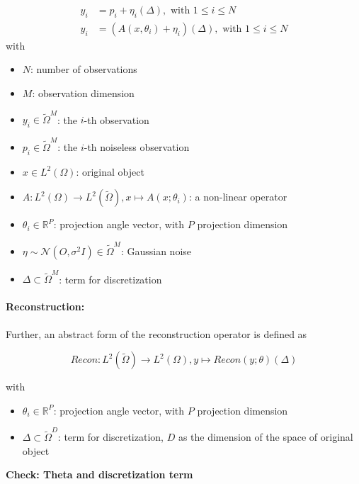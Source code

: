 \begin{equation}
    \label{eq:abstract-model}
    \begin{aligned}
        y_i &= p_i + \eta_i (\Delta), \text{ with } 1 \leq i \leq N \\
        y_i &= \left( A(x, \theta_i) + \eta_i \right) (\Delta), \text{ with } 1 \leq i \leq N 
    \end{aligned}
\end{equation}
with
\begin{itemize}
    \item $N$: number of observations
    \item $M$: observation dimension
    \item $y_i \in \tilde{\Omega}^M$: the $i$-th observation
    \item $p_i \in \tilde{\Omega}^M$: the $i$-th noiseless observation
    \item $x \in L^2(\Omega)$: original object
    \item $A: L^2(\Omega) \to L^2(\tilde{\Omega}), x \mapsto A(x; \theta_i)$: a non-linear operator 
    \item $\theta_i \in \mathbb{R}^P$: projection angle vector, with $P$ projection dimension
    \item $\eta \sim \mathcal{N}(O, \sigma^2 I) \in \tilde{\Omega}^M$: Gaussian noise
    \item $\Delta \subset \tilde{\Omega}^{M}$: term for discretization
\end{itemize}

\paragraph{Reconstruction:}
Further, an abstract form of the reconstruction operator is defined as 

\begin{equation}
    \textit{Recon} : L^2(\tilde{\Omega}) \to L^2(\Omega), y \mapsto Recon(y; \theta) (\Delta)
\end{equation}

with
\begin{itemize}
    \item $\theta_i \in \mathbb{R}^P$: projection angle vector, with $P$ projection dimension
    \item $\Delta \subset \tilde{\Omega}^{D}$: term for discretization, $D$ as the dimension of the space of original object
\end{itemize}

\textbf{Check: Theta and discretization term}

